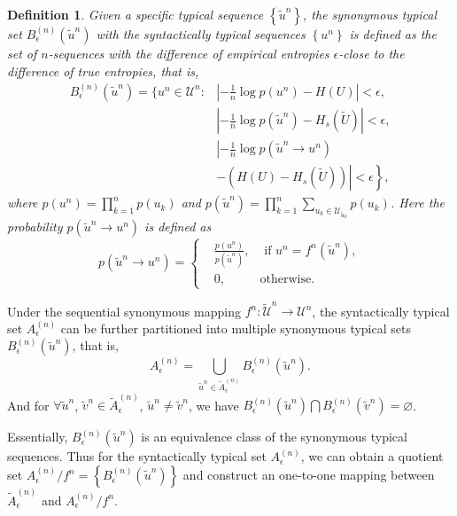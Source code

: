 \documentclass[12pt, draftclsnofoot,onecolumn]{IEEEtran}
\newtheorem{definition}{\bf{Definition}}
\begin{document}
\begin{definition}
Given a specific typical sequence $\left\{\tilde{u}^n\right\}$, the synonymous typical set $B_{\epsilon}^{(n)}\left(\tilde{u}^n\right)$ with the syntactically typical sequences $\left\{u^n\right\}$ is defined as the set of $n$-sequences with the difference of empirical entropies  $\epsilon$-close to the difference of true entropies, that is,
\begin{equation}
\begin{aligned}
B_{\epsilon}^{(n)}\left(\tilde{u}^n\right)=\bigg\{ u^n\in \mathcal{U}^n: &\left|-\frac{1}{n}\log p\left(u^n\right)-H(U)\right|<\epsilon,\\
&\left|-\frac{1}{n}\log p\left(\tilde{u}^n\right)-H_s(\tilde{U})\right|<\epsilon,\\
&\left|-\frac{1}{n}\log p(\tilde{u}^n\to u^n)\right.\\
&\left.\left.-\left(H(U)-H_s(\tilde{U})\right)\right|<\epsilon\right\},
\end{aligned}
\end{equation}
where $p(u^n)\!\!=\!\!\prod_{k=1}^{n} p(u_k)$ and $ p(\tilde{u}^n)\!\!=\!\!\prod_{k=1}^{n} \sum_{u_k\in \mathcal{U}_{\tilde{u}_k}}\!\!\!\!p(u_k)$. Here the probability $p(\tilde{u}^n\to u^n)$ is defined as
\begin{equation}
p(\tilde{u}^n\to u^n)=\left\{
\begin{aligned}
&\frac{p\left(u^n\right)}{p\left(\tilde{u}^n\right)},&\text{ if } u^n=f^n(\tilde{u}^n),\\
&0, &\text{otherwise}.
\end{aligned}\right.
\end{equation}
\end{definition}

Under the sequential synonymous mapping $f^n:\tilde{\mathcal{U}}^n\to{\mathcal{U}}^n$, the syntactically typical set $A_{\epsilon}^{(n)}$ can be further partitioned into multiple synonymous typical sets $B_{\epsilon}^{(n)}\left(\tilde{u}^n\right)$, that is,
\begin{equation}
A_{\epsilon}^{(n)}=\bigcup_{\tilde{u}^n\in \tilde{A}_{\epsilon}^{(n)}} B_{\epsilon}^{(n)}\left(\tilde{u}^n\right).
\end{equation}
And for $\forall \tilde{u}^n$, $\tilde{v}^n \in \tilde{A}_{\epsilon}^{(n)}$, $\tilde{u}^n \neq \tilde{v}^n$, we have $B_{\epsilon}^{(n)}\left(\tilde{u}^n\right) \bigcap B_{\epsilon}^{(n)}\left(\tilde{v}^n\right)=\varnothing$.

Essentially, $B_{\epsilon}^{(n)}\left(\tilde{u}^n\right)$ is an equivalence class of the synonymous typical sequences. Thus for the syntactically typical set $A_{\epsilon}^{(n)}$, we can obtain a quotient set $A_{\epsilon}^{(n)}/f^n=\left\{B_{\epsilon}^{(n)}(\tilde{u}^n)\right\}$ and construct an one-to-one mapping between $\tilde{A}_{\epsilon}^{(n)}$ and $A_{\epsilon}^{(n)}/f^n$.
\end{document}
